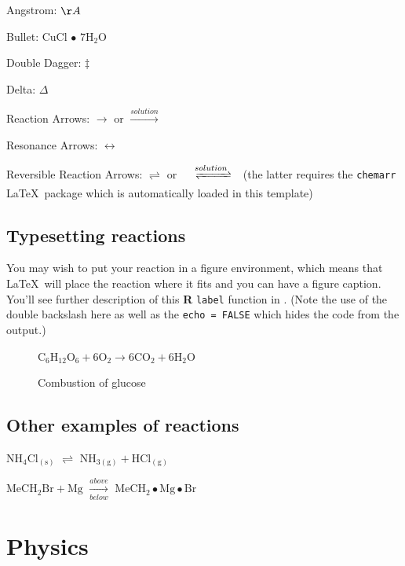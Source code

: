 \documentclass[12pt,twoside]{reedthesis}
\begin{document}
  \noindent Angstrom: \({\AA}\)
  
  \noindent Bullet: CuCl \(\bullet\) \(\mathrm{7H_{2}O}\)
  
  \noindent Double Dagger: \(\ddag\)
  
  \noindent Delta: \(\Delta\)
  
  \noindent Reaction Arrows: \(\longrightarrow\) or
  \(\xrightarrow{solution}\)
  
  \noindent Resonance Arrows: \(\leftrightarrow\)
  
  \noindent Reversible Reaction Arrows: \(\rightleftharpoons\) or
  \(\xrightleftharpoons[ ]{solution}\) (the latter requires the
  \texttt{chemarr} \LaTeX~package which is automatically loaded in this
  template)
  
  \subsection{Typesetting reactions}\label{typesetting-reactions}
  
  You may wish to put your reaction in a figure environment, which means
  that \LaTeX~will place the reaction where it fits and you can have a
  figure caption. You'll see further description of this \textbf{R}
  \texttt{label} function in \protect\hyperlink{refux5flabels}{}. (Note
  the use of the double backslash here as well as the
  \texttt{echo\ =\ FALSE} which hides the code from the output.)
  
  \begin{figure}[h!tbp]
  \begin{center}
  $\mathrm{C_6H_{12}O_6  + 6O_2} \longrightarrow \mathrm{6CO_2 + 6H_2O}$
  \caption{Combustion of glucose}
  \label{fig:comb-gluc}
  \end{center}
  \end{figure}
  
  \subsection{Other examples of
  reactions}\label{other-examples-of-reactions}
  
  \(\mathrm{NH_4Cl_{(s)}}\) \(\rightleftharpoons\)
  \(\mathrm{NH_{3(g)}+HCl_{(g)}}\)
  
  \noindent \(\mathrm{MeCH_2Br + Mg}\) \(\xrightarrow[below]{above}\)
  \(\mathrm{MeCH_2\bullet Mg \bullet Br}\)
  
  \section{Physics}\label{physics}
  
\end{document}
